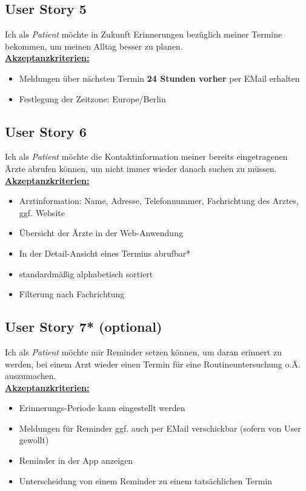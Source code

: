 \documentclass[conference]{IEEEtran}
\begin{document}
\subsection{User Story 5}
Ich als \textit{Patient} möchte in Zukunft Erinnerungen bezüglich meiner Termine bekommen, um meinen Alltag besser zu planen.\\
\underline{\textbf{Akzeptanzkriterien:}}
\begin{itemize}
	\item Meldungen über nächsten Termin \textbf{24 Stunden vorher} per EMail erhalten
	\item Festlegung der Zeitzone: Europe/Berlin
\end{itemize}

\subsection{User Story 6}
Ich als \textit{Patient} möchte die Kontaktinformation meiner bereits eingetragenen Ärzte abrufen können, um nicht immer wieder danach suchen zu müssen.\\
\underline{\textbf{Akzeptanzkriterien:}}
\begin{itemize}
	\item Arztinformation: Name, Adresse, Telefonnummer, Fachrichtung des Arztes, ggf. Website 
	\item Übersicht der Ärzte in der Web-Anwendung
	\item In der Detail-Ansicht eines Termins abrufbar*
	\item standardmäßig alphabetisch sortiert
	\item Filterung nach Fachrichtung
\end{itemize}

\subsection{User Story 7* (optional)}
Ich als \textit{Patient} möchte mir Reminder setzen können, um daran erinnert zu werden, bei einem Arzt wieder einen Termin für eine Routineuntersuchung o.Ä. auszumachen.\\
\underline{\textbf{Akzeptanzkriterien:}}
\begin{itemize}
	\item Erinnerungs-Periode kann eingestellt werden
	\item Meldungen für Reminder ggf. auch per EMail verschickbar (sofern von User gewollt)
	\item Reminder in der App anzeigen
	\item Unterscheidung von einem Reminder zu einem tatsächlichen Termin
\end{itemize}
\end{document}

